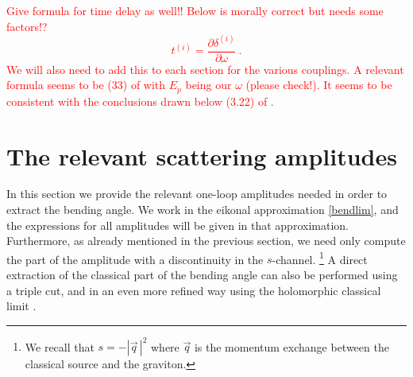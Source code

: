 \documentclass[a4paper,11pt]{article}
\numberwithin{equation}{section}
\begin{document}
\textcolor{red}{ Give formula for time delay as well!! Below is morally correct but needs some factors!?
\begin{equation}
t^{(i)} = \frac{\partial \delta^{(i)}}{\partial \omega}
\ .
\end{equation}
We will also need to add this to each section for the various couplings. A relevant formula seems to be (33) of
\cite{Ciafaloni:2014esa} with $E_p$ being our $\omega$ (please check!). It seems to be consistent with the conclusions drawn below (3.22) of  \cite{Camanho:2014apa}. 
}



\section{The relevant scattering amplitudes}

In this section we provide the relevant one-loop amplitudes needed in order to extract the  bending angle. We work in the eikonal approximation \eqref{bendlim}, and the expressions for all amplitudes will be given in that approximation.  
Furthermore, as already mentioned in the previous section, we need only  compute the part of the amplitude with  a discontinuity in the $s$-channel.%
\footnote{We recall that  $s=-|\vec{q}\, |^2$ where  $\vec{q}$ is the  momentum exchange between the classical source and the graviton. }
A direct extraction of the classical part of the bending  angle can also be  performed  using a triple cut, and in an even more refined way using the holomorphic classical limit \cite{Guevara:2017csg}.
\end{document}
